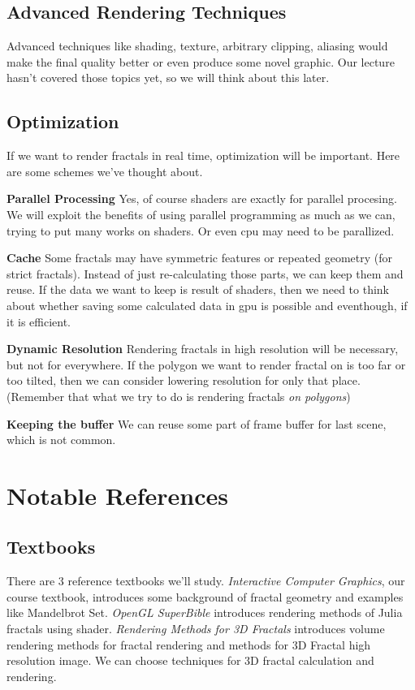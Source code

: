 \documentclass[a4paper]{article}
\begin{document}
\subsection{Advanced Rendering Techniques}
Advanced techniques like shading, texture, arbitrary clipping, aliasing would make the final quality better or even produce some novel graphic.
Our lecture hasn't covered those topics yet, so we will think about this later.

\subsection{Optimization}
If we want to render fractals in real time, optimization will be important.
Here are some schemes we've thought about.

\textbf{Parallel Processing}
Yes, of course shaders are exactly for parallel procesing.
We will exploit the benefits of using parallel programming as much as we can, trying to put many works on shaders.
Or even cpu may need to be parallized.

\textbf{Cache}
Some fractals may have symmetric features or repeated geometry (for strict fractals).
Instead of just re-calculating those parts, we can keep them and reuse.
If the data we want to keep is result of shaders, then we need to think about whether saving some calculated data in gpu is possible and eventhough, if it is efficient.

\textbf{Dynamic Resolution}
Rendering fractals in high resolution will be necessary, but not for everywhere.
If the polygon we want to render fractal on is too far or too tilted, then we can consider lowering resolution for only that place.
(Remember that what we try to do is rendering fractals \textit{on polygons})

\textbf{Keeping the buffer}
We can reuse some part of frame buffer for last scene, which is not common.


\section{Notable References}
\subsection{Textbooks}
There are 3 reference textbooks we'll study.
\textit{Interactive Computer Graphics}\cite{c1}, our course textbook, introduces some background of fractal geometry and examples like Mandelbrot Set.
\textit{OpenGL SuperBible}\cite{c2} introduces rendering methods of Julia fractals using shader.
\textit{Rendering Methods for 3D Fractals}\cite{c3} introduces volume rendering methods for fractal rendering and methods for 3D Fractal high resolution image. We can choose techniques for 3D fractal calculation and rendering.
\end{document}

